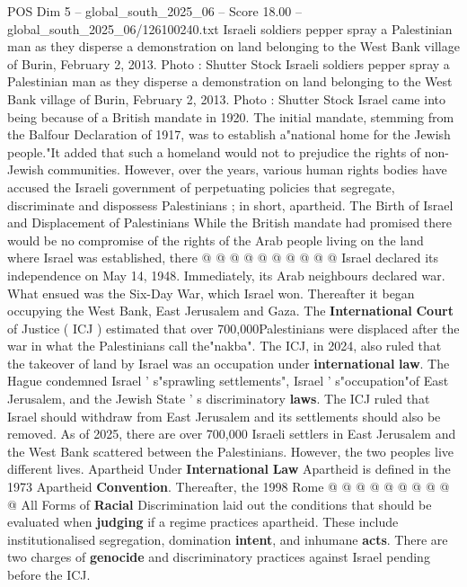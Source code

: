 \begin{textsample}{POS Dim 5 – global\_south\_2025\_06 – Score 18.00 – global\_south\_2025\_06/126100240.txt}  \label{ex:f5_pos_042}
Israeli soldiers pepper spray a Palestinian man as they disperse a demonstration on land belonging to the West Bank village of Burin, February 2, 2013.
Photo : Shutter Stock Israeli soldiers pepper spray a Palestinian man as they disperse a demonstration on land belonging to the West Bank village of Burin, February 2, 2013.
Photo : Shutter Stock Israel came into being because of a British mandate in 1920.
The initial mandate, stemming from the Balfour Declaration of 1917, was to establish a"national home for the Jewish people."It added that such a homeland would not to prejudice the rights of non-Jewish communities.
However, over the years, various human rights bodies have accused the Israeli government of perpetuating policies that segregate, discriminate and dispossess Palestinians ; in short, apartheid.
The Birth of Israel and Displacement of Palestinians While the British mandate had promised there would be no compromise of the rights of the Arab people living on the land where Israel was established, there @ @ @ @ @ @ @ @ @ @ Israel declared its independence on May 14, 1948.
Immediately, its Arab neighbours declared war.
What ensued was the Six-Day War, which Israel won.
Thereafter it began occupying the West Bank, East Jerusalem and Gaza.
The \textbf{International} \textbf{Court} of Justice ( ICJ ) estimated that over 700,000Palestinians were displaced after the war in what the Palestinians call the"nakba".
The ICJ, in 2024, also ruled that the takeover of land by Israel was an occupation under \textbf{international} \textbf{law}.
The Hague condemned Israel ' s"sprawling settlements", Israel ' s"occupation"of East Jerusalem, and the Jewish State ' s discriminatory \textbf{laws}.
The ICJ ruled that Israel should withdraw from East Jerusalem and its settlements should also be removed.
As of 2025, there are over 700,000 Israeli settlers in East Jerusalem and the West Bank scattered between the Palestinians.
However, the two peoples live different lives.
Apartheid Under \textbf{International} \textbf{Law} Apartheid is defined in the 1973 Apartheid \textbf{Convention}.
Thereafter, the 1998 Rome @ @ @ @ @ @ @ @ @ @ All Forms of \textbf{Racial} Discrimination laid out the conditions that should be evaluated when \textbf{judging} if a regime practices apartheid.
These include institutionalised segregation, domination \textbf{intent}, and inhumane \textbf{acts}.
There are two charges of \textbf{genocide} and discriminatory practices against Israel pending before the ICJ.

\end{textsample}
